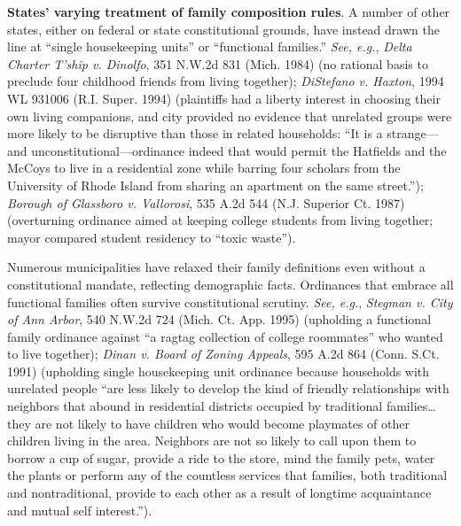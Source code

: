 \item
\textbf{States' varying treatment of family composition rules}. A number of
other states, either on federal or state constitutional grounds, have instead
drawn the line at ``single housekeeping units'' or ``functional families.''
\textit{See, e.g.}, \emph{Delta Charter T'ship v. Dinolfo}, 351 N.W.2d 831
(Mich. 1984) (no rational basis to preclude four childhood friends from living
together); \emph{DiStefano v. Haxton}, 1994 WL 931006 (R.I. Super. 1994)
(plaintiffs had a liberty interest in choosing their own living companions, and
city provided no evidence that unrelated groups were more likely to be
disruptive than those in related households: ``It is a strange---and
unconstitutional---ordinance indeed that would permit the Hatfields and the
McCoys to live in a residential zone while barring four scholars from the
University of Rhode Island from sharing an apartment on the same street.'');
\emph{Borough of Glassboro v. Vallorosi}, 535 A.2d 544 (N.J. Superior Ct. 1987)
(overturning ordinance aimed at keeping college students from living together;
mayor compared student residency to ``toxic waste'').

Numerous municipalities have relaxed their family definitions even without a
constitutional mandate, reflecting demographic facts. Ordinances that embrace
all functional families often survive constitutional scrutiny. \textit{See,
e.g.}, \emph{Stegman v. City of Ann Arbor}, 540 N.W.2d 724 (Mich. Ct. App. 1995)
(upholding a functional family ordinance against ``a ragtag collection of
college roommates'' who wanted to live together); \emph{Dinan v. Board of Zoning
Appeals}, 595 A.2d 864 (Conn. S.Ct. 1991) (upholding single housekeeping unit
ordinance because households with unrelated people ``are less likely to develop
the kind of friendly relationships with neighbors that abound in residential
districts occupied by traditional families\ldots they are not likely to have
children who would become playmates of other children living in the area.
Neighbors are not so likely to call upon them to borrow a cup of sugar, provide
a ride to the store, mind the family pets, water the plants or perform any of
the countless services that families, both traditional and nontraditional,
provide to each other as a result of longtime acquaintance and mutual self
interest.'').

